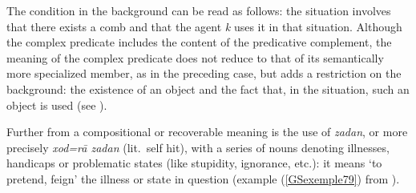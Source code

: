 {
\z

\begin{exe}
\end{exe}

The condition in the background can be read as follows: the situation  involves that there exists a comb and that the agent \emph{k} uses it in that situation. Although the complex predicate includes the content of the predicative complement, the meaning of the complex predicate does not reduce to that of its semantically more specialized member, as in the preceding case, but adds a restriction on the background: the existence of an object and the fact that, in the situation, such an object is used (see \citealt[10]{bonami2010persian}).  

Further from a compositional or recoverable meaning is the use of \emph{zadan}, or more precisely \emph{xod=r\=a zadan} (lit.\ self hit), with a series of nouns denoting illnesses, handicaps or problematic states (like stupidity, ignorance, etc.): it means `to pretend, feign' the illness or state in question (example (\ref{GSexemple79}) from \citealt[223]{pollet2012grammaire}).

\z

}
